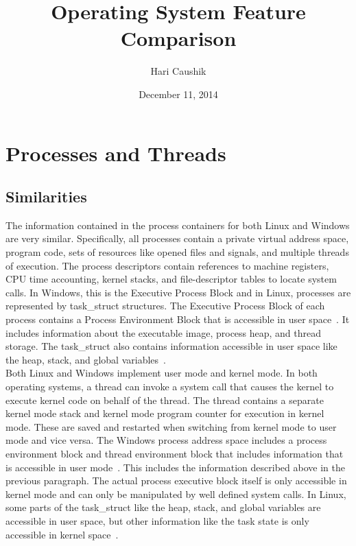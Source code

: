 \documentclass[letterpaper,10pt,titlepage]{article}
\title{Operating System Feature Comparison}
\date{December 11, 2014}
\author{Hari Caushik}
\begin{document}
\maketitle
\thispagestyle{empty}
\newpage

\tableofcontents
\newpage

\section{Processes and Threads}
\subsection{Similarities}
The information contained in the process containers for both Linux and Windows
are very similar. Specifically, all processes contain a private virtual 
address space, program code, sets of resources like opened files and signals,
and multiple threads of execution. The process descriptors contain references
to machine registers, CPU time accounting, kernel stacks, and file-descriptor
tables to locate system calls. In Windows, this is the Executive Process Block
and in Linux, processes are represented by task\_struct structures. The 
Executive Process Block of each process contains a Process Environment Block 
that is accessible in user space~\cite{rsw6}. It includes information about the executable
image, process heap, and thread storage. The task\_struct also contains 
information accessible in user space like the heap, stack, and global
variables~\cite{love3}.
\\
\linebreak
Both Linux and Windows implement user mode and kernel mode. In both operating
systems, a thread can invoke a system call that causes the kernel to execute
kernel code on behalf of the thread. The thread contains a separate kernel 
mode stack and kernel mode program counter for execution in kernel mode. These
are saved and restarted when switching from kernel mode to user mode and vice
versa. The Windows process address space includes a process environment block
and thread environment block that includes information that is accessible in
user mode~\cite{rsw6}. This includes the information described above in the previous
paragraph. The actual process executive block itself is only accessible in 
kernel mode and can only be manipulated by well defined system calls. In Linux,
some parts of the task\_struct like the heap, stack, and global variables are
accessible in user space, but other information like the task state is only
accessible in kernel space~\cite{tm10}. 
\end{document}
